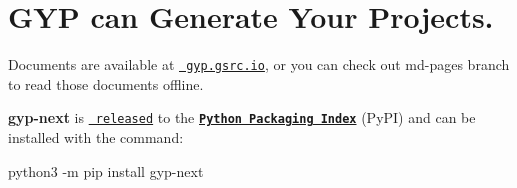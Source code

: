\chapter{GYP can Generate Your Projects.}
\hypertarget{md__2_users_2hello_2_documents_2_git_hub_2finalproject-engine-drop-table-engines_2_engine_2src_280d351ba2054b530d93991a389e22236}{}\label{md__2_users_2hello_2_documents_2_git_hub_2finalproject-engine-drop-table-engines_2_engine_2src_280d351ba2054b530d93991a389e22236}
Documents are available at \href{https://gyp.gsrc.io}{\texttt{ gyp.\+gsrc.\+io}}, or you can check out {\ttfamily md-\/pages} branch to read those documents offline.

{\bfseries{gyp-\/next}} is \href{https://github.com/nodejs/gyp-next/releases}{\texttt{ released}} to the \href{https://pypi.org/project/gyp-next}{\texttt{ {\bfseries{Python Packaging Index}}}} (Py\+PI) and can be installed with the command\+:
\begin{DoxyItemize}
\item {\ttfamily python3 -\/m pip install gyp-\/next} 
\end{DoxyItemize}